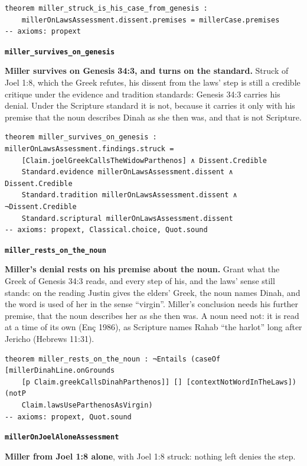 \documentclass[11pt]{article}
\begin{document}
{\small\begin{verbatim}
theorem miller_struck_is_his_case_from_genesis :
    millerOnLawsAssessment.dissent.premises = millerCase.premises
-- axioms: propext
\end{verbatim}}
\par\medskip\noindent\textbf{\texttt{miller\_\allowbreak{}survives\_\allowbreak{}on\_\allowbreak{}genesis}}\par\nobreak\noindent
\textbf{Miller survives on Genesis 34:3, and turns on the standard.} Struck of Joel 1:8, which the Greek refutes, his dissent from the laws’ step is still a credible critique under the evidence and tradition standards: Genesis 34:3 carries his denial. Under the Scripture standard it is not, because it carries it only with his premise that the noun describes Dinah as she then was, and that is not Scripture.

{\small\begin{verbatim}
theorem miller_survives_on_genesis : millerOnLawsAssessment.findings.struck =
    [Claim.joelGreekCallsTheWidowParthenos] ∧ Dissent.Credible
    Standard.evidence millerOnLawsAssessment.dissent ∧ Dissent.Credible
    Standard.tradition millerOnLawsAssessment.dissent ∧ ¬Dissent.Credible
    Standard.scriptural millerOnLawsAssessment.dissent
-- axioms: propext, Classical.choice, Quot.sound
\end{verbatim}}
\par\medskip\noindent\textbf{\texttt{miller\_\allowbreak{}rests\_\allowbreak{}on\_\allowbreak{}the\_\allowbreak{}noun}}\par\nobreak\noindent
\textbf{Miller’s denial rests on his premise about the noun.} Grant what the Greek of Genesis 34:3 reads, and every step of his, and the laws’ sense still stands: on the reading Justin gives the elders’ Greek, the noun names Dinah, and the word is used of her in the sense “virgin”. Miller’s conclusion needs his further premise, that the noun describes her as she then was. A noun need not: it is read at a time of its own (Enç 1986), as Scripture names Rahab “the harlot” long after Jericho (Hebrews 11:31).

{\small\begin{verbatim}
theorem miller_rests_on_the_noun : ¬Entails (caseOf [millerDinahLine.onGrounds
    [p Claim.greekCallsDinahParthenos]] [] [contextNotWordInTheLaws]) (notP
    Claim.lawsUseParthenosAsVirgin)
-- axioms: propext, Quot.sound
\end{verbatim}}
\par\medskip\noindent\textbf{\texttt{miller\allowbreak{}On\allowbreak{}Joel\allowbreak{}Alone\allowbreak{}Assessment}}\par\nobreak\noindent
\textbf{Miller from Joel 1:8 alone}, with Joel 1:8 struck: nothing left denies the step.
\end{document}
